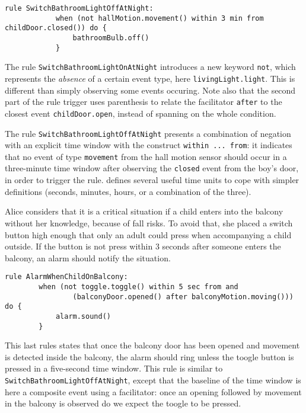 \begin{description}[leftmargin=0cm]
\begin{lstlisting}[language=iotdsl,
							label=lis:night-rule,
		caption=Rules to switch on\//off lights in the corridor at night]
		rule SwitchBathroomLightOffAtNight:	
			when (not hallMotion.movement() within 3 min from childDoor.closed()) do {
				bathroomBulb.off()
			}
	\end{lstlisting}
	The rule \lstinline[language=iotdsl]{SwitchBathroomLightOnAtNight} introduces a new keyword \lstinline[language=iotdsl]{not}, which represents the \emph{absence} of a certain event type, here \lstinline[language=iotdsl]{livingLight.light}. This is different than simply observing some events occuring. Note also that the second part of the rule trigger uses parenthesis to relate the facilitator \lstinline[language=iotdsl]{after} to the closest event \lstinline[language=iotdsl]{childDoor.open}, instead of spanning on the whole condition.

	The rule \lstinline[language=iotdsl]{SwitchBathroomLightOffAtNight} presents a combination of negation with an explicit time window with the construct \lstinline[language=iotdsl]{within ... from}: it indicates that no event of type \lstinline[language=iotdsl]{movement} from the hall motion sensor should occur in a three-minute time window after observing the \lstinline[language=iotdsl]{closed} event from the boy's door, in order to trigger the rule. \IOTDSL defines several useful time units to cope with simpler definitions (seconds, minutes, hours, or a combination of the three). 
	

	\item[Report unsupervised children on balcony] Alice considers that it is a critical situation if a child enters into the balcony without her knowledge, because of fall risks. To avoid that, she placed a switch button high enough that only an adult could press when accompanying a child outside. If the button is not press within 3 seconds after someone enters the balcony, an alarm should notify the situation.
	\begin{lstlisting}[language=iotdsl,
							label=lis:balcony-rule,
		caption=Rules to ring the alarm in case of an unsupervised child in the balcony]
	rule AlarmWhenChildOnBalcony:	
		when (not toggle.toggle() within 5 sec from and
				(balconyDoor.opened() after balconyMotion.moving())) do {
			alarm.sound()
		}
	\end{lstlisting}
	This last rules states that once the balcony door has been opened and movement is detected inside the balcony, the alarm should ring unless the toogle button is pressed in a five-second time window. This rule is similar to \lstinline[language=iotdsl]{SwitchBathroomLightOffAtNight}, except that the baseline of the time window is here a composite event using a facilitator: once an opening followed by movement in the balcony is observed do we expect the toogle to be pressed. 
\end{description}
